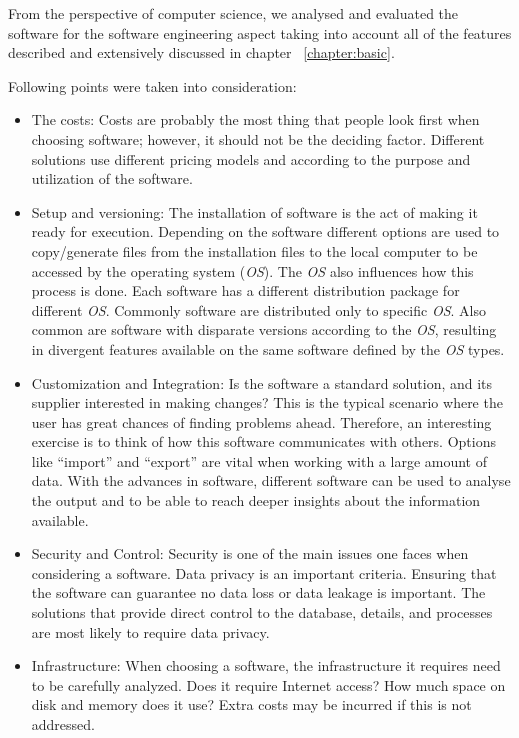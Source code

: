 From the perspective of computer science, we analysed and evaluated the software for the software engineering aspect taking into account all of the features described and extensively discussed in chapter ~\ref{chapter:basic}.

Following points were taken into consideration:
\begin{itemize}
\item The costs: Costs are probably the most thing that people look first when choosing software; however, it should not be the deciding factor. Different solutions use different pricing models and according to the purpose and utilization of the software.

\item Setup and versioning: The installation of software is the act of making it ready for execution. Depending on the software different options are used to copy/generate files from the installation files to the local computer to be accessed by the operating system (\emph{OS}). The \emph{OS} also influences how this process is done. Each software has a different distribution package for different \emph{OS}. Commonly software are distributed only to specific \emph{OS}. Also common are software with disparate versions according to the \emph{OS}, resulting in divergent features available on the same software defined by the \emph{OS} types.

\item Customization and Integration: Is the software a standard solution, and its supplier interested in making changes? This is the typical scenario where the user has great chances of finding problems ahead. Therefore, an interesting exercise is to think of how this software communicates with others. Options like  ``import'' and ``export'' are vital when working with a large amount of data. With the advances in software, different software can be used to analyse the output and to be able to reach deeper insights about the information available. 

\item Security and Control: Security is one of the main issues one faces when considering a software. Data privacy is an important criteria. Ensuring that the software can guarantee no data loss or data leakage is important. The solutions that provide direct control to the database, details, and processes are most likely to require data privacy.

\item Infrastructure: When choosing a software, the infrastructure it requires need to be carefully analyzed. Does it require Internet access? How much space on disk and memory does it use? Extra costs may be incurred if this is not addressed.


\end{itemize}
